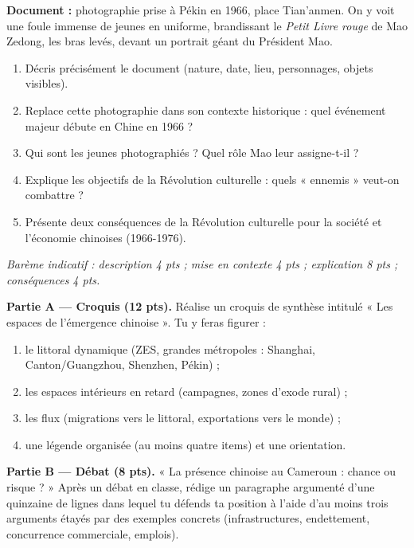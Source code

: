 \documentclass[11pt]{article}
\begin{document}
\begin{exercice}
\textbf{Document :} photographie prise à Pékin en 1966, place Tian'anmen. On y voit une foule immense de jeunes en uniforme, brandissant le \emph{Petit Livre rouge} de Mao Zedong, les bras levés, devant un portrait géant du Président Mao.
\begin{enumerate}
\item Décris précisément le document (nature, date, lieu, personnages, objets visibles).
\item Replace cette photographie dans son contexte historique : quel événement majeur débute en Chine en 1966 ?
\item Qui sont les jeunes photographiés ? Quel rôle Mao leur assigne-t-il ?
\item Explique les objectifs de la Révolution culturelle : quels « ennemis » veut-on combattre ?
\item Présente deux conséquences de la Révolution culturelle pour la société et l'économie chinoises (1966-1976).
\end{enumerate}
\emph{Barème indicatif : description 4 pts ; mise en contexte 4 pts ; explication 8 pts ; conséquences 4 pts.}
\end{exercice}

\begin{exercice}
\textbf{Partie A — Croquis (12 pts).} Réalise un croquis de synthèse intitulé « Les espaces de l'émergence chinoise ». Tu y feras figurer :
\begin{enumerate}
\item le littoral dynamique (ZES, grandes métropoles : Shanghai, Canton/Guangzhou, Shenzhen, Pékin) ;
\item les espaces intérieurs en retard (campagnes, zones d'exode rural) ;
\item les flux (migrations vers le littoral, exportations vers le monde) ;
\item une légende organisée (au moins quatre items) et une orientation.
\end{enumerate}
\textbf{Partie B — Débat (8 pts).} « La présence chinoise au Cameroun : chance ou risque ? » Après un débat en classe, rédige un paragraphe argumenté d'une quinzaine de lignes dans lequel tu défends ta position à l'aide d'au moins trois arguments étayés par des exemples concrets (infrastructures, endettement, concurrence commerciale, emplois).
\end{exercice}
\end{document}
